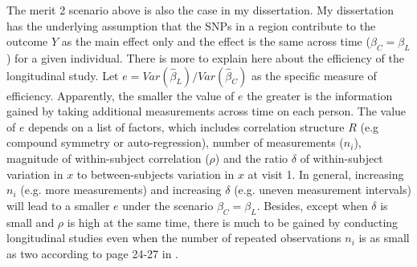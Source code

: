 \documentclass[12pt]{article}
\begin{document}
The merit 2 scenario above is also the case in my dissertation. My dissertation has the underlying assumption that the SNPs in a region contribute to the outcome $Y$ as the main effect only and the effect is the same across time ($\beta_C = \beta_L$) for a given individual. There is more to explain here about the efficiency of the longitudinal study. Let $e = Var(\hat{\beta}_L) / Var(\hat{\beta}_C)$ as the specific measure of efficiency. Apparently, the smaller the value of $e$ the greater is the information gained by taking additional measurements across time on each person. The value of $e$ depends on a list of factors, which includes correlation structure $R$ (e.g compound symmetry or auto-regression), number of measurements ($n_i$), magnitude of within-subject correlation ($\rho$) and the ratio $\delta$ of within-subject variation in $x$ to between-subjects variation in $x$ at visit 1. In general, increasing $n_i$ (e.g. more measurements) and increasing $\delta$ (e.g. uneven measurement intervals) will lead to a smaller $e$ under the scenario $\beta_C = \beta_L$. Besides, except when $\delta$ is small and $\rho$ is high at the same time, there is much to be gained by conducting longitudinal studies even when the number of repeated observations $n_i$ is as small as two according to page 24-27 in \cite{Diggle2002}. 
\end{document}
